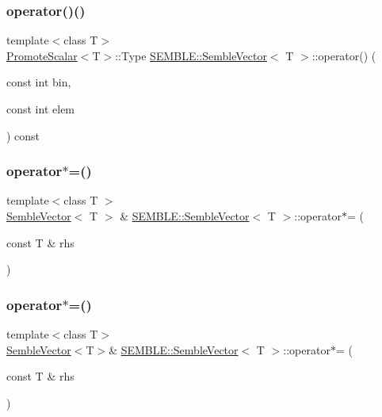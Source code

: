 \subsubsection{\texorpdfstring{operator()()}{operator()()}\hspace{0.1cm}{\footnotesize\ttfamily [4/4]}}
{\footnotesize\ttfamily template$<$class T$>$ \\
\mbox{\hyperlink{structSEMBLE_1_1PromoteScalar}{Promote\+Scalar}}$<$T$>$\+::Type \mbox{\hyperlink{structSEMBLE_1_1SembleVector}{S\+E\+M\+B\+L\+E\+::\+Semble\+Vector}}$<$ T $>$\+::operator() (\begin{DoxyParamCaption}\item[{const int}]{bin,  }\item[{const int}]{elem }\end{DoxyParamCaption}) const}

\mbox{\label{structSEMBLE_1_1SembleVector_a5e6dd715504318591b835bc2643a0c63}} 
\subsubsection{\texorpdfstring{operator$\ast$=()}{operator*=()}\hspace{0.1cm}{\footnotesize\ttfamily [1/6]}}
{\footnotesize\ttfamily template$<$class T $>$ \\
\mbox{\hyperlink{structSEMBLE_1_1SembleVector}{Semble\+Vector}}$<$ T $>$ \& \mbox{\hyperlink{structSEMBLE_1_1SembleVector}{S\+E\+M\+B\+L\+E\+::\+Semble\+Vector}}$<$ T $>$\+::operator$\ast$= (\begin{DoxyParamCaption}\item[{const T \&}]{rhs }\end{DoxyParamCaption})}

\mbox{\label{structSEMBLE_1_1SembleVector_a4f0bf3e46c82699c75a57ba48af0bf77}} 
\subsubsection{\texorpdfstring{operator$\ast$=()}{operator*=()}\hspace{0.1cm}{\footnotesize\ttfamily [2/6]}}
{\footnotesize\ttfamily template$<$class T$>$ \\
\mbox{\hyperlink{structSEMBLE_1_1SembleVector}{Semble\+Vector}}$<$T$>$\& \mbox{\hyperlink{structSEMBLE_1_1SembleVector}{S\+E\+M\+B\+L\+E\+::\+Semble\+Vector}}$<$ T $>$\+::operator$\ast$= (\begin{DoxyParamCaption}\item[{const T \&}]{rhs }\end{DoxyParamCaption})}


